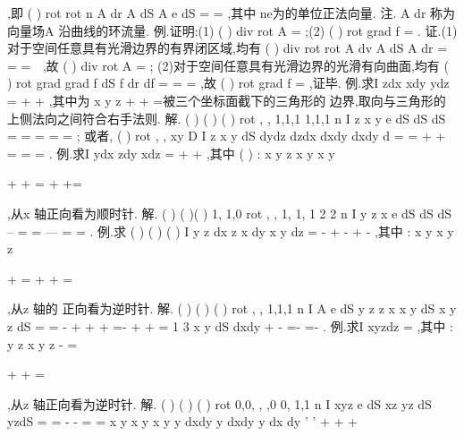 \int 
\int \int 
\nabla 
,即 
(
)
rot
rot
n
A dr
A dS
A e
dS
\Gamma 
\Sigma 
\Sigma 
\cdots 
=
\cdots 
=
\cdots 
\int 
\int \int 
\int \int 
\rho 
\rho 
\rho 
\rho 
\rho 
\rho 
\nabla 
,其中
ne\rho 为\Sigma 的单位正法向量. 
\textcolor{lyred}{注}.
A dr
\Gamma 
\cdots 
\int 
\rho 
\rho 
\nabla 
称为向量场A
\rho 
沿曲线\Gamma 的\textcolor{lyred}{环流量}. 
\textcolor{lyred}{例}.证明:(1)
(
)
div rot
A =
\rho 
;(2)
(
)
rot grad
f
=
\rho 
. 
证.(1)对于空间任意具有光滑边界的有界闭区域\Omega ,均有 
(
)
div rot
rot
A dv
A dS
A dr
\Omega 
\partial \Omega 
\partial \partial \Omega 
=
\cdots 
=
\cdots 
=
\int \int \int 
\int \int 
\int 
\rho 
\rho 
\rho 
\rho 
\rho 

\nabla 
,故
(
)
div rot
A =
\rho 
; 
(2)对于空间任意具有光滑边界的光滑有向曲面\Sigma ,均有 
(
)
rot grad
grad
f
dS
f dr
df
\Sigma 
\partial \Sigma 
\partial \Sigma 
\cdots 
=
\cdots 
=
=
\int \int 
\int 
\int 
\rho 
\rho 
\nabla 
\nabla 
,故
(
)
rot grad
f
=
\rho 
,证毕. 
\textcolor{lyred}{例}.求I
zdx
xdy
ydz
\Gamma 
=
+
+
\int \nabla 
,其中\Gamma 为
x
y
z
+
+
=被三个坐标面截下的三角形的 
边界,取向与三角形的上侧法向之间符合右手法则. 
解.
(
)
(
)
(
)
rot
, ,
1,1,1
1,1,1
n
I
z x y
e dS
dS
dS
\Sigma 
\Sigma 
\Sigma 
=
\cdots 
=
\cdots 
=
=
\cdots 
=
\int \int 
\int \int 
\int \int 
\rho 
; 
或者,
(
)
rot
, ,
xy
D
I
z x y
dS
dydz
dzdx
dxdy
dxdy
d\sigma 
\Sigma 
\Sigma 
\Sigma 
=
\cdots 
=
+
+
=
=
=
\int \int 
\int \int 
\int \int 
\int \int 
\rho 
. 
\textcolor{lyred}{例}.求I
ydx
zdy
xdz
\Gamma 
=
+
+
\int \nabla 
,其中
(
)
:
x
y
z
x
y
x
y

+
+
=
+
\Gamma +=

,从x 轴正向看为顺时针. 
解.
(
)
(
)(
)
1, 1,0
rot
, ,
1, 1, 1
2 2
n
I
y z x
e dS
dS
dS
\pi 
\Sigma 
\Sigma 
\Sigma 
--
=
\cdots 
=
---
\cdots 
=
=
\int \int 
\int \int 
\int \int 
\rho 
. 
\textcolor{lyred}{例}.求
(
)
(
)
(
)
I
y
z
dx
z
x
dy
x
y
dz
\Gamma 
=
-
+
-
+
-
\int \nabla 
,其中
:
x
y
x
y
z

+
=
\Gamma +
+
=

,从z 轴的 
正向看为逆时针. 
解.
(
)
(
)
(
)
rot
,
,
1,1,1
n
I
A e dS
y
z z
x x
y
dS
x
y
z dS
\Sigma 
\Sigma 
\Sigma 
=
\cdots 
=
-
+
+
+
\cdots 
=-
+
+
=
\int \int 
\int \int 
\int \int 
\rho {} 1
3 x
y
dS
dxdy
\pi 
\Sigma 
+
\le 
-
=-
=-
\int \int 
\int \int 
. 
\textcolor{lyred}{例}.求I
xyzdz
\Gamma 
=\int \nabla 
,其中
:
y
z
x
y
z
-
=

\Gamma 
+
+
=

,从z 轴正向看为逆时针. 
解.
(
)
(
)
(
)
rot 0,0,
,
,0
0, 1,1
n
I
xyz
e dS
xz
yz
dS
yzdS
\Sigma 
\Sigma 
\Sigma 
=
\cdots 
=
-
\cdots 
-
=
=
\int \int 
\int \int 
\int \int 
\rho 
x
y
x
y
x
y
y
dxdy
y dxdy
y
dx dy
'
'
+
\le 
+
\le 
+
\le 

